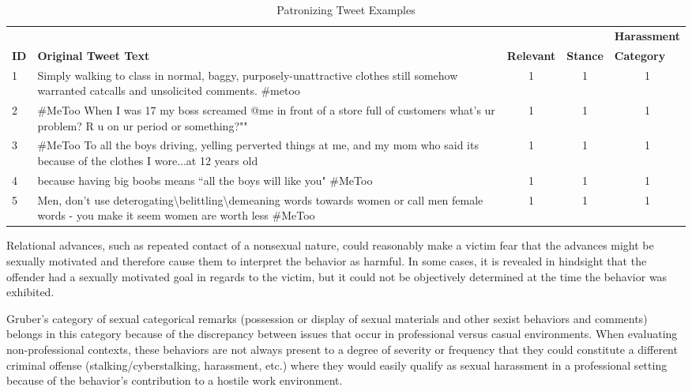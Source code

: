 \begin{table}[H]
    \centering
    \caption{Patronizing Tweet Examples}
    \begin{tabular}{m{1cm} m{8cm} m{1.5cm} m{1.1cm} m{2.1cm}}
        \toprule
        & {} & {} & {} & {\textbf{Harassment}} \\
        \rowcolor{White}\textbf{ID} & {\textbf{Original Tweet Text}} & {\textbf{Relevant}} & {\textbf{Stance}} & {\textbf{Category}} \\
                \midrule
        1 & {Simply walking to class in normal, baggy, purposely-unattractive clothes still somehow warranted catcalls and unsolicited comments. \#metoo} & \multicolumn{1}{c}{1} & \multicolumn{1}{c}{1} & \multicolumn{1}{c}{1}\\
        2 & {\#MeToo When I was 17 my boss screamed @me in front of a store full of customers what's ur problem? R u on ur period or something?""} & \multicolumn{1}{c}{1} & \multicolumn{1}{c}{1} & \multicolumn{1}{c}{1}\\
        3 & {\#MeToo To all the boys driving, yelling perverted things at me, and my mom who said its because of the clothes I wore...at 12 years old} & \multicolumn{1}{c}{1} & \multicolumn{1}{c}{1} & \multicolumn{1}{c}{1}\\
        4 & {because having big boobs means ``all the boys will like you" \#MeToo} & \multicolumn{1}{c}{1} & \multicolumn{1}{c}{1} & \multicolumn{1}{c}{1}\\
        5 & {Men, don't use deterogating\textbackslash{}belittling\textbackslash{}demeaning words towards women or call men female words - you make it seem women are worth less \#MeToo} & \multicolumn{1}{c}{1} & \multicolumn{1}{c}{1} & \multicolumn{1}{c}{1}\\
        \bottomrule
    \end{tabular}
\end{table}

Relational advances, such as repeated contact of a nonsexual nature, could reasonably make a victim fear that the advances might be sexually motivated and therefore cause them to interpret the behavior as harmful. In some cases, it is revealed in hindsight that the offender had a sexually motivated goal in regards to the victim, but it could not be objectively determined at the time the behavior was exhibited.

Gruber's category of sexual categorical remarks (possession or display of sexual materials and other sexist behaviors and comments) belongs in this category because of the discrepancy between issues that occur in professional versus casual environments. When evaluating non-professional contexts, these behaviors are not always present to a degree of severity or frequency that they could constitute a different criminal offense (stalking/cyberstalking, harassment, etc.) where they would easily qualify as sexual harassment in a professional setting because of the behavior's contribution to a hostile work environment.


